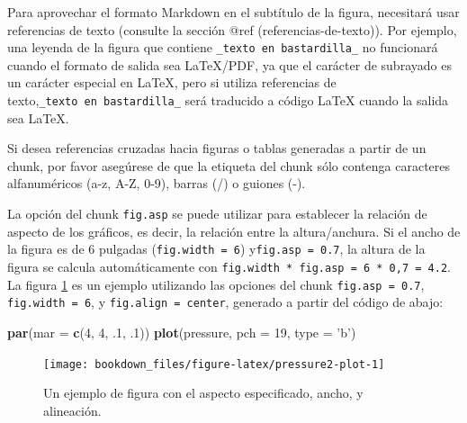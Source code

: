 \documentclass[12pt,]{krantz}
\makeatletter
\newenvironment{Shaded}{\begin{snugshade}}{\end{snugshade}}
\newcommand{\KeywordTok}[1]{\textcolor[rgb]{0.13,0.29,0.53}{\textbf{{#1}}}}
\newcommand{\DataTypeTok}[1]{\textcolor[rgb]{0.13,0.29,0.53}{{#1}}}
\newcommand{\DecValTok}[1]{\textcolor[rgb]{0.00,0.00,0.81}{{#1}}}
\newcommand{\StringTok}[1]{\textcolor[rgb]{0.31,0.60,0.02}{{#1}}}
\newcommand{\NormalTok}[1]{{#1}}
\newenvironment{kframe}{%
\medskip{}
\setlength{\fboxsep}{.8em}
 \def\at@end@of@kframe{}%
 \ifinner\ifhmode%
  \def\at@end@of@kframe{\end{minipage}}%
  \begin{minipage}{\columnwidth}%
 \fi\fi%
 \def\FrameCommand##1{\hskip\@totalleftmargin \hskip-\fboxsep
 \colorbox{shadecolor}{##1}\hskip-\fboxsep
     \hskip-\linewidth \hskip-\@totalleftmargin \hskip\columnwidth}%
 \MakeFramed {\advance\hsize-\width
   \@totalleftmargin\z@ \linewidth\hsize
   \@setminipage}}%
 {\par\unskip\endMakeFramed%
 \at@end@of@kframe}
\renewenvironment{Shaded}{\begin{kframe}}{\end{kframe}}
\theoremstyle{definition}
\theoremstyle{definition}
\theoremstyle{remark}
\let\BeginKnitrBlock\begin \let\EndKnitrBlock\end
\makeatother
\begin{document}
Para aprovechar el formato Markdown en el subtítulo de la figura,
necesitará usar referencias de texto (consulte la sección @ref
(referencias-de-texto)). Por ejemplo, una leyenda de la figura que
contiene \texttt{\_texto\ en\ bastardilla\_} no funcionará cuando el
formato de salida sea LaTeX/PDF, ya que el carácter de subrayado es un
carácter especial en LaTeX, pero si utiliza referencias de
texto,\texttt{\_texto\ en\ bastardilla\_} será traducido a código LaTeX
cuando la salida sea LaTeX.

\BeginKnitrBlock{rmdimportant}
Si desea referencias cruzadas hacia figuras o tablas generadas a partir
de un chunk, por favor asegúrese de que la etiqueta del chunk sólo
contenga caracteres alfanuméricos (a-z, A-Z, 0-9), barras (/) o guiones
(-).
\EndKnitrBlock{rmdimportant}

La opción del chunk \texttt{fig.asp} se puede utilizar para establecer
la relación de aspecto de los gráficos, es decir, la relación entre la
altura/anchura. Si el ancho de la figura es de 6 pulgadas
(\texttt{fig.width\ =\ 6}) y\texttt{fig.asp\ =\ 0.7}, la altura de la
figura se calcula automáticamente con
\texttt{fig.width\ *\ fig.asp\ =\ 6\ *\ 0,7\ =\ 4.2}. La figura
\ref{fig:pressure2-plot} es un ejemplo utilizando las opciones del chunk
\texttt{fig.asp\ =\ 0.7}, \texttt{fig.width\ =\ 6}, y
\texttt{fig.align\ =\ \textquotesingle{}center\textquotesingle{}},
generado a partir del código de abajo:

\begin{Shaded}
\begin{Highlighting}[]
\KeywordTok{par}\NormalTok{(}\DataTypeTok{mar =} \KeywordTok{c}\NormalTok{(}\DecValTok{4}\NormalTok{, }\DecValTok{4}\NormalTok{, .}\DecValTok{1}\NormalTok{, .}\DecValTok{1}\NormalTok{))}
\KeywordTok{plot}\NormalTok{(pressure, }\DataTypeTok{pch =} \DecValTok{19}\NormalTok{, }\DataTypeTok{type =} \StringTok{'b'}\NormalTok{)}
\end{Highlighting}
\end{Shaded}

\begin{figure}

{\centering \texttt{[image: bookdown\_files/figure-latex/pressure2-plot-1]} 

}

\caption{Un ejemplo de figura con el aspecto especificado, ancho, y alineación.}\label{fig:pressure2-plot}
\end{figure}
\end{document}
